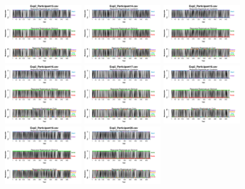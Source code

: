 \begin{figure}[th]
\includegraphics[width=0.30\textwidth]{Figures/BiasResp_Exp2_P13} \includegraphics[width=0.30\textwidth]{Figures/BiasResp_Exp2_P14} \includegraphics[width=0.30\textwidth]{Figures/BiasResp_Exp2_P15}
\includegraphics[width=0.30\textwidth]{Figures/BiasResp_Exp2_P16} \includegraphics[width=0.30\textwidth]{Figures/BiasResp_Exp2_P17} \includegraphics[width=0.30\textwidth]{Figures/BiasResp_Exp2_P18}
\includegraphics[width=0.30\textwidth]{Figures/BiasResp_Exp2_P19} \includegraphics[width=0.30\textwidth]{Figures/BiasResp_Exp2_P20}

\end{figure}

